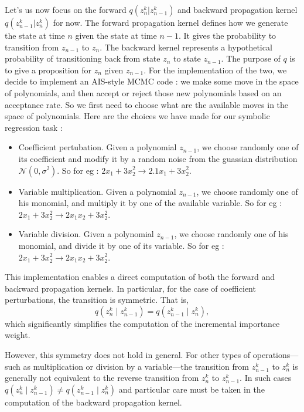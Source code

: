 \documentclass[11pt]{article}
\begin{document}
		Let's us now focus on the forward $q(z_n^k | z_{n-1}^k)$ and backward propagation kernel $q(z_{n-1}^k | z_n^k)$ for now. The forward propagation kernel defines how we generate the state at time $n$ given the state at time $n-1$. It gives the probability to transition from $z_{n-1}$ to $z_n$. The backward kernel represents a hypothetical probability of transitioning back from state $z_n$ to state $z_{n-1}$. The purpose of $q$ is to give a proposition for $z_n$ given $z_{n-1}$. For the implementation of the two, we decide to implement an AIS-style MCMC code : we make some move in the space of polynomials, and then accept or reject those new polynomials based on an acceptance rate. So we first need to choose what are the available moves in the space of polynomials. Here are the choices we have made for our symbolic regression task : 
		\begin{itemize}
			\item Coefficient pertubation. Given a polynomial $z_{n-1}$, we choose randomly one of its coefficient and modify it by a random noise from the guassian distribution $\mathcal{N}(0,\sigma^2)$. So for eg : $2 x_1 + 3 x_2^2 \rightarrow  2.1 x_1 + 3 x_2^2$.
			\item Variable multiplication. Given a polynomial $z_{n-1}$, we choose randomly one of his monomial, and multiply it by one of the available variable. So for eg : $2 x_1 + 3 x_2^2 \rightarrow  2 x_1 x_2 + 3 x_2^2$.
			\item Variable division. Given a polynomial $z_{n-1}$, we choose randomly one of his monomial, and divide it by one of its variable. So for eg : $2 x_1 + 3 x_2^2 \rightarrow  2 x_1 x_2 + 3 x_2^2$. 
		\end{itemize}
		This implementation enables a direct computation of both the forward and backward propagation kernels. In particular, for the case of coefficient perturbations, the transition is symmetric. That is,
		\begin{equation}
			q(z_n^k \mid z_{n-1}^k) = q(z_{n-1}^k \mid z_n^k),
		\end{equation}
		which significantly simplifies the computation of the incremental importance weight.
		
		However, this symmetry does not hold in general. For other types of operations—such as multiplication or division by a variable—the transition from \( z_{n-1}^k \) to \( z_n^k \) is generally not equivalent to the reverse transition from \( z_n^k \) to \( z_{n-1}^k \). In such cases $q(z_n^k \mid z_{n-1}^k) \ne q(z_{n-1}^k \mid z_n^k)$ and particular care must be taken in the computation of the backward propagation kernel.
		
\end{document}
